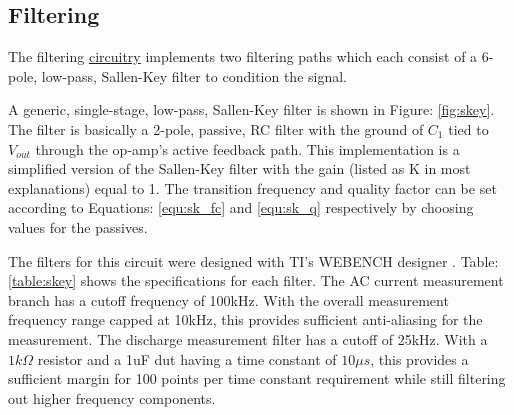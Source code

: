 \subsection{Filtering}
\label{sec:filtering}
\nocite{kirk_skey}

The filtering \hyperlink{sch:filtering}{circuitry} implements two filtering paths which each consist of a 6-pole, low-pass, Sallen-Key filter to condition the signal.




A generic, single-stage, low-pass, Sallen-Key filter is shown in Figure: \ref{fig:skey}. The filter is basically a 2-pole, passive, RC filter with the ground of $C_1$ tied to $V_{out}$ through the op-amp's active feedback path. This implementation is a simplified version of the Sallen-Key filter with the gain (listed as K in most explanations) equal to 1. The transition frequency and quality factor can be set according to Equations: \eqref{equ:sk_fc} and \eqref{equ:sk_q} respectively by choosing values for the passives.



The filters for this circuit were designed with TI's WEBENCH designer \cite{webench}. Table: \ref{table:skey} shows the specifications for each filter. 
The AC current measurement branch has a cutoff frequency of 100kHz. With the overall measurement frequency range capped at 10kHz, this provides sufficient anti-aliasing for the measurement. The discharge measurement filter has a cutoff of 25kHz. With a $1k\Omega$ resistor and a 1uF \gls{dut} having a time constant of $10\mu s$, this provides a sufficient margin for 100 points per time constant requirement while still filtering out higher frequency components.

